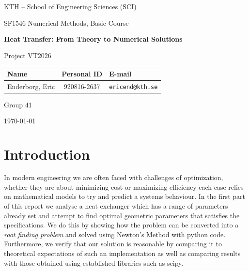 \documentclass[11pt, a4paper]{article}
\theoremstyle{definition}
\begin{document}
\begin{titlepage}
  \centering
  \vspace*{1.5cm}
  {\Large KTH -- School of Engineering Sciences (SCI)\par}
  \vspace{0.4cm}
  {\large SF1546 Numerical Methods, Basic Course\par}
  \vspace{2cm}
  {\huge\bfseries Heat Transfer: From Theory to Numerical Solutions\par}
  \vspace{0.8cm}
  {\Large Project VT2026\par}
  \vspace{3cm}

  \begin{tabular}{@{}lcl@{}}
    \toprule
    \textbf{Name} & \textbf{Personal ID} & \textbf{E-mail} \\
    \midrule
    Enderborg, Eric & 920816-2637 & \texttt{ericend@kth.se} \\
    \bottomrule
  \end{tabular}

  \vspace{1.5cm}
  {\large Group 41\par}
  \vspace{0.5cm}
  {\large \today\par}
\end{titlepage}

\tableofcontents
\newpage

\section{Introduction}
In modern engineering we are often faced with challenges of optimization, whether they are about minimizing cost or maximizing efficiency each case relies on mathematical models to try and predict a systems behaviour. In the first part of this report we analyse a heat exchanger which has a range of parameters already set and attempt to find optimal geometric parameters that satisfies the specifications. We do this by showing how the problem can be converted into a \textit{root finding problem} and solved using Newton's Method with python code. Furthermore, we verify that our solution is reasonable by comparing it to theoretical expectations of such an implementation as well as comparing results with those obtained using established libraries such as scipy.
\end{document}
